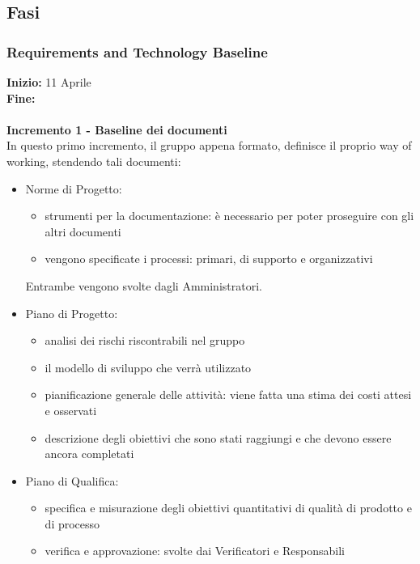 \subsection{Fasi} 
{    
    \subsubsection{Requirements and Technology Baseline} 
    {
    \textbf{Inizio:} 11 Aprile \\
    \textbf{Fine:} \\ \\ %
    \textbf{Incremento 1 - Baseline dei documenti} \\ 
    In questo primo incremento, il gruppo appena formato, definisce il proprio way of working, stendendo tali documenti:
    \begin{itemize}
        \item Norme di Progetto:
            \begin{itemize}
                \item strumenti per la documentazione: è necessario per poter proseguire con gli altri documenti
                \item vengono specificate i processi: primari, di supporto e organizzativi 
            \end{itemize}
        Entrambe vengono svolte dagli Amministratori.
        \item Piano di Progetto: 
            \begin{itemize}
                \item analisi dei rischi riscontrabili nel gruppo
                \item il modello di sviluppo che verrà utilizzato
                \item pianificazione generale delle attività: viene fatta una stima dei costi attesi e osservati
                \item descrizione degli obiettivi che sono stati raggiungi e che devono essere ancora completati     
            \end{itemize}
        \item Piano di Qualifica: 
            \begin{itemize}
                \item specifica e misurazione degli obiettivi quantitativi di qualità di prodotto e di processo
                \item verifica e approvazione: svolte dai Verificatori e Responsabili
            \end{itemize}

\end{itemize}}}
